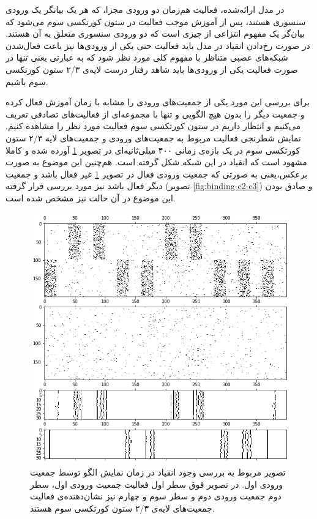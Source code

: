 \documentclass[12pt]{report}
\begin{document}
	در مدل ارائه‌شده، فعالیت هم‌زمان دو ورودی مجزا، که هر یک بیانگر یک ورودی سنسوری هستند،  پس از آموزش موجب فعالیت در ستون کورتکسی سوم می‌شود که بیان‌گر یک مفهوم انتزاعی از چیزی است که دو ورودی سنسوری متعلق به آن هستند. در صورت رخ‌دادن انقیاد در مدل باید فعالیت حتی یکی از ورودی‌ها نیز باعث فعال‌شدن شبکه‌های عصبی متناظر با مفهوم کلی مورد نظر شود که به عبارتی یعنی تنها در صورت فعالیت یکی از ورودی‌ها باید شاهد رفتار درست لایه‌ی ۲/۳ ستون کورتکسی سوم باشیم.
	
	برای بررسی این مورد یکی از جمعیت‌های ورودی را مشابه با زمان آموزش فعال کرده و جمعیت دیگر را بدون هیچ الگویی و تنها با مجموعه‌ای از فعالیت‌های تصادفی تعریف می‌کنیم و انتظار داریم در ستون کورتکسی سوم فعالیت مورد نظر را مشاهده کنیم. نمایش شطرنجی فعالیت مربوط به جمعیت‌های ورودی و جمعیت‌های لایه ۲/۳ ستون کورتکسی سوم در یک بازه‌ی زمانی ۴۰۰ میلی‌ثانیه‌ای در تصویر \ref{fig:binding-c1-c3} آورده شده‌ و کاملا مشهود است که انقیاد در این شبکه شکل گرفته است. هم‌چنین این موضوع به صورت برعکس،یعنی به صورتی که جمعیت ورودی فعال در تصویر \ref{fig:binding-c1-c3} غیر فعال باشد و جمعیت دیگر فعال باشد نیز مورد بررسی قرار گرفته (تصویر \ref{fig:binding-c2-c3}) و صادق بودن این موضوع در آن حالت نیز مشخص شده‌ است.
	
	\begin{figure}[H]
		\centering
		\includegraphics[width=1.0\linewidth]{binding-c1-c3.png}
		\caption[NS]{
			تصویر مربوط به بررسی وجود انقیاد در زمان نمایش الگو توسط جمعیت ورودی اول. در تصویر فوق سطر اول فعالیت جمعیت ورودی اول، سطر دوم جمعیت ورودی دوم و سطر سوم و چهارم نیز نشان‌دهنده‌ی فعالیت جمعیت‌های لایه‌ی ۲/۳ ستون کورتکسی سوم هستند.
		}
		\label{fig:binding-c1-c3} 
	\end{figure}
\end{document}
